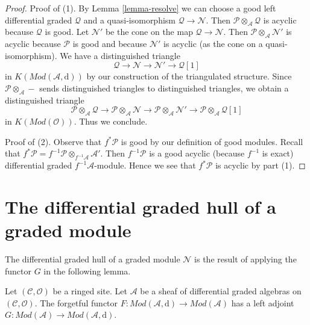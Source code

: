 \begin{proof}
Proof of (1). By Lemma \ref{lemma-resolve} we can choose a good
left differential graded $\mathcal{Q}$ and a quasi-isomorphism
$\mathcal{Q} \to \mathcal{N}$. Then
$\mathcal{P} \otimes_\mathcal{A} \mathcal{Q}$
is acyclic because $\mathcal{Q}$ is good.
Let $\mathcal{N}'$ be the cone on the map
$\mathcal{Q} \to \mathcal{N}$. Then
$\mathcal{P} \otimes_\mathcal{A} \mathcal{N}'$ is acyclic because
$\mathcal{P}$ is good and because $\mathcal{N}'$ is acyclic
(as the cone on a quasi-isomorphism). We have a distinguished
triangle
$$
\mathcal{Q} \to \mathcal{N} \to \mathcal{N}' \to \mathcal{Q}[1]
$$
in $K(\textit{Mod}(\mathcal{A}, \text{d}))$ by our construction
of the triangulated structure. Since
$\mathcal{P} \otimes_\mathcal{A} -$ sends distinguished
triangles to distinguished triangles, we obtain a distinguished
triangle
$$
\mathcal{P} \otimes_\mathcal{A} \mathcal{Q} \to
\mathcal{P} \otimes_\mathcal{A} \mathcal{N} \to
\mathcal{P} \otimes_\mathcal{A} \mathcal{N}' \to
\mathcal{P} \otimes_\mathcal{A} \mathcal{Q}[1]
$$
in $K(\textit{Mod}(\mathcal{O}))$. Thus we conclude.

\medskip\noindent
Proof of (2). Observe that $f^*\mathcal{P}$ is good by our definition
of good modules. Recall that
$f^*\mathcal{P} = f^{-1}\mathcal{P} \otimes_{f^{-1}\mathcal{A}} \mathcal{A}'$.
Then $f^{-1}\mathcal{P}$ is a good acyclic (because $f^{-1}$ is exact)
differential graded $f^{-1}\mathcal{A}$-module. Hence
we see that $f^*\mathcal{P}$ is acyclic by part (1).
\end{proof}






\section{The differential graded hull of a graded module}
\label{section-dg-hull}

\noindent
The differential graded hull of a graded module $\mathcal{N}$ is
the result of applying the functor $G$ in the following lemma.

\begin{lemma}
\label{lemma-dg-hull}
Let $(\mathcal{C}, \mathcal{O})$ be a ringed site.
Let $\mathcal{A}$ be a sheaf of differential graded algebras
on $(\mathcal{C}, \mathcal{O})$. The forgetful functor
$F : \textit{Mod}(\mathcal{A}, \text{d}) \to \textit{Mod}(\mathcal{A})$
has a left adjoint $G : \textit{Mod}(\mathcal{A}) \to
\textit{Mod}(\mathcal{A}, \text{d})$.
\end{lemma}

